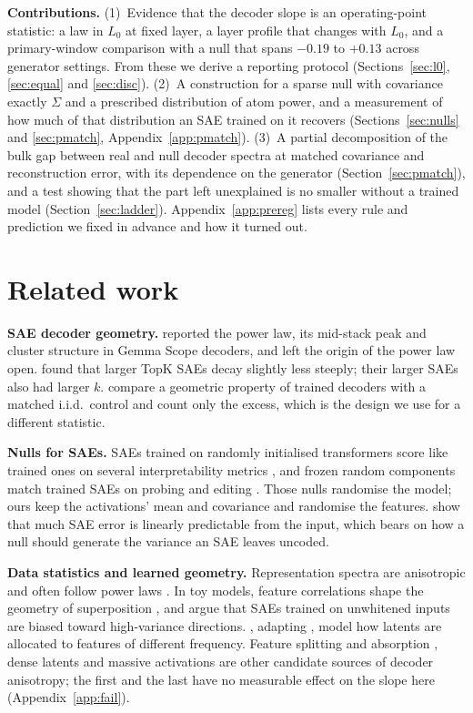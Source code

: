 \documentclass[10pt,twocolumn]{article}
\newcommand{\Sig}{\Sigma}
\newcommand{\Lz}{L_0}
\begin{document}
\textbf{Contributions.}
(1)~Evidence that the decoder slope is an operating-point statistic: a law in $\Lz$ at fixed layer, a layer profile that changes with $\Lz$, and a primary-window comparison with a null that spans $-0.19$ to $+0.13$ across generator settings. From these we derive a reporting protocol (Sections~\ref{sec:l0}, \ref{sec:equal} and \ref{sec:disc}).
(2)~A construction for a sparse null with covariance exactly $\Sig$ and a prescribed distribution of atom power, and a measurement of how much of that distribution an SAE trained on it recovers (Sections~\ref{sec:nulls} and \ref{sec:pmatch}, Appendix~\ref{app:pmatch}).
(3)~A partial decomposition of the bulk gap between real and null decoder spectra at matched covariance and reconstruction error, with its dependence on the generator (Section~\ref{sec:pmatch}), and a test showing that the part left unexplained is no smaller without a trained model (Section~\ref{sec:ladder}).
Appendix~\ref{app:prereg} lists every rule and prediction we fixed in advance and how it turned out.

\section{Related work}

\textbf{SAE decoder geometry.} \citet{li2025geometry} reported the power law, its mid-stack peak and cluster structure in Gemma Scope decoders, and left the origin of the power law open. \citet{peter2025progressive} found that larger TopK SAEs decay slightly less steeply; their larger SAEs also had larger $k$. \citet{borobia2026nearfloor} compare a geometric property of trained decoders with a matched i.i.d.\ control and count only the excess, which is the design we use for a different statistic.

\textbf{Nulls for SAEs.} SAEs trained on randomly initialised transformers score like trained ones on several interpretability metrics \citep{heap2025random}, and frozen random components match trained SAEs on probing and editing \citep{korznikov2026sanity}. Those nulls randomise the model; ours keep the activations' mean and covariance and randomise the features. \citet{engels2025darkmatter} show that much SAE error is linearly predictable from the input, which bears on how a null should generate the variance an SAE leaves uncoded.

\textbf{Data statistics and learned geometry.} Representation spectra are anisotropic \citep{ethayarajh2019contextual} and often follow power laws \citep{ghosh2022powerlaws}. In toy models, feature correlations shape the geometry of superposition \citep{prieto2026correlations}, and \citet{saraswatula2025whitening} argue that SAEs trained on unwhitened inputs are biased toward high-variance directions. \citet{michaud2025manifolds}, adapting \citet{brill2024scaling}, model how latents are allocated to features of different frequency. Feature splitting and absorption \citep{chanin2025absorption}, dense latents \citep{sun2025dense} and massive activations \citep{sun2024massive} are other candidate sources of decoder anisotropy; the first and the last have no measurable effect on the slope here (Appendix~\ref{app:fail}).
\end{document}
